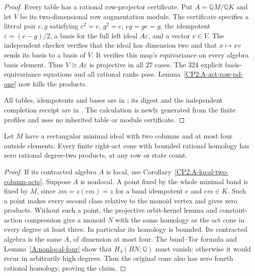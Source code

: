 \begin{proof}
Every table has a rational row-projector certificate.
Put $A=\mathbb QM/\mathbb QK$ and let $V$ be its
two-dimensional row augmentation module. The certificate
specifies a literal pair $e,g$ satisfying
$e^2=e$, $g^2=e$, $eg=ge=g$, the idempotent
$\varepsilon=(e-g)/2$, a basis for the full left ideal
$A\varepsilon$, and a vector $v\in V$. The independent
checker verifies that the ideal has dimension two and
that $x\mapsto xv$ sends its basis to a basis of $V$.
It verifies this map's equivariance on every algebra
basis element. Thus $V\cong A\varepsilon$ is projective
in all $27$ cases. The $324$ explicit basis-equivariance
equations and all rational ranks pass.
Lemma~\ref{CP2:A-act-row-pd-one} now kills the products.

All tables, idempotents and bases are in
; its
digest and the independent completion receipt are in
.
The calculation is newly generated from the finite
profiles and uses no inherited table or module certificate.
\end{proof}

\begin{lemma}
\label{CP2:A-two-column-four-outside-bounded}
Let $M$ have a rectangular minimal ideal with two
columns and at most four outside elements. Every finite
right-act cone with bounded rational homology has zero
rational degree-two products, at any row or state count.
\end{lemma}
\begin{proof}
If its contracted algebra $A$ is local, use
Corollary~\ref{CP2:A-local-two-column-acts}.
Suppose $A$ is nonlocal. A point fixed by the whole
minimal band is fixed by $M$, since $zm=z(em)=z$
for a band idempotent $e$ and $em\in K$. Such a
point makes every second class relative to the monoid
vertex and gives zero products.
Without such a point, the projective orbit-kernel lemma
and constant-action compression give a monoid $N$
with the same homology as the act cone in every degree
at least three. In particular its homology is bounded.
Its contracted algebra is the same $A$, of dimension
at most four. The band--Tor formula and
Lemma~\ref{A:nonlocal-four} show that $H_4(BN;\mathbb Q)$
must vanish: otherwise it would recur in arbitrarily
high degrees. Thus the original cone also has zero
fourth rational homology, proving the claim.
\end{proof}

